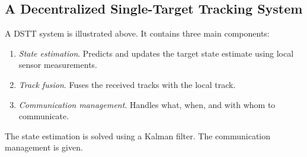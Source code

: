 \documentclass[a0paper,portrait,twocols]{def/LiUposter} %
\begin{document}
{\begin{minipage}{\columnwidth}







\subsection{A Decentralized Single-Target Tracking System}

\vspace{0.5em}

\begin{center}
	\begin{tikzpicture}[scale=3]
		
	\end{tikzpicture}
\end{center}

A DSTT system is illustrated above. It contains three main components:
\begin{enumerate}
	\item \emph{State estimation}. Predicts and updates the target state estimate using local sensor measurements.
	\item \emph{Track fusion}. Fuses the received tracks with the local track.
	\item \emph{Communication management}. Handles what, when, and with whom to communicate.
\end{enumerate}
The state estimation is solved using a Kalman filter. The communication management is given. %





\end{minipage}}
\end{document}
